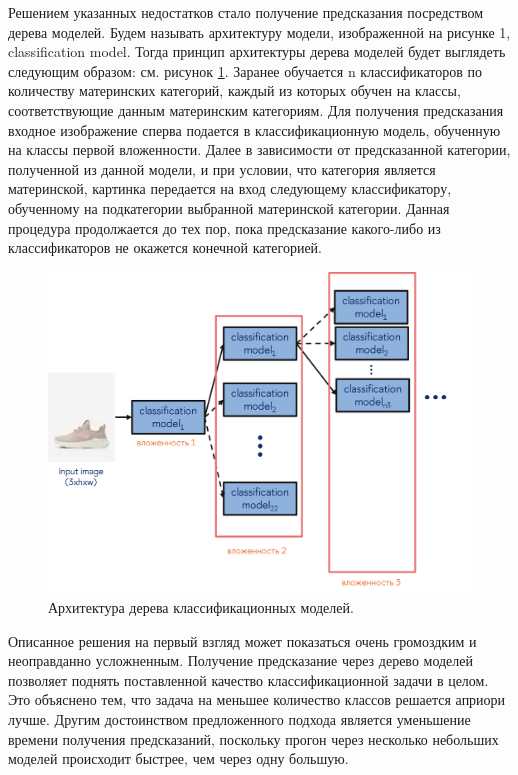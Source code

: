 \documentclass[a4paper,12pt]{extarticle}
\begin{document}
Решением указанных недостатков стало получение предсказания посредством дерева моделей. Будем называть архитектуру модели, изображенной на рисунке 1, classification model. Тогда принцип архитектуры дерева моделей будет выглядеть следующим образом: см. рисунок \ref{fig:classification_treemodel}. Заранее обучается n классификаторов по количеству материнских категорий, каждый из которых обучен на классы, соответствующие данным материнским категориям. Для получения предсказания входное изображение сперва подается в классификационную модель, обученную на классы первой вложенности. Далее в зависимости от предсказанной категории, полученной из данной модели, и при условии, что категория является материнской, картинка передается на вход следующему классификатору, обученному на подкатегории выбранной материнской категории. Данная процедура продолжается до тех пор, пока предсказание какого-либо из классификаторов не окажется конечной категорией.

\begin{figure}[ht]
	\centering
	\includegraphics[scale=0.7]{classification_treemodel.png}
	\caption{Архитектура дерева классификационных моделей.}
	\label{fig:classification_treemodel}
\end{figure}

Описанное решения на первый взгляд может показаться очень громоздким и неоправданно усложненным. Получение предсказание через дерево моделей позволяет поднять поставленной качество классификационной задачи в целом. Это объяснено тем, что задача на меньшее количество классов решается априори лучше. Другим достоинством предложенного подхода является уменьшение времени получения предсказаний, поскольку прогон через несколько небольших моделей происходит быстрее, чем через одну большую.
\end{document}
